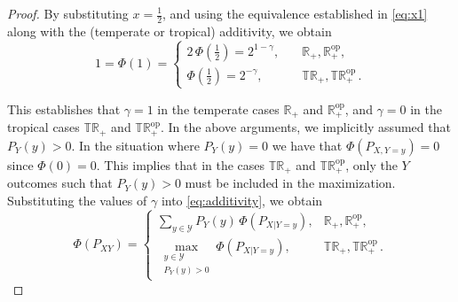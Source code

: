 \documentclass[aps,pra,11pt,onecolumn,nofootinbib,tightenlines]{revtex4-2}
\theoremstyle{definition}
\newcommand{\Y}{\mathcal{Y}}
\begin{document}
\begin{proof}
By substituting $x = \frac{1}{2}$, and using the equivalence established in \eqref{eq:x1} along with the (temperate or tropical) additivity, we obtain
\begin{equation}
1 = \Phi(1) =
\begin{cases}
2\,\Phi\!\left(\tfrac{1}{2}\right) = 2^{1-\gamma}, & \quad \mathbb{R}_+,\mathbb{R}_+^{\mathrm{op}}, \\
\Phi\!\left(\tfrac{1}{2}\right) = 2^{-\gamma}, & \quad \mathbb{TR}_+,\mathbb{TR}_+^{\mathrm{op}} \,.
\end{cases}
\end{equation}

This establishes that $\gamma = 1$ in the temperate cases $\mathbb{R}_+$ and $\mathbb{R}^{\mathrm{op}}_+$, and $\gamma = 0$ in the tropical cases $\mathbb{TR}_+$ and $\mathbb{TR}^{\mathrm{op}}_+$. In the above arguments, we implicitly assumed that $P_{Y}(y)>0$. In the situation where $P_Y(y)=0$ we have that $\Phi(P_{X,Y=y}) =0$ since $\Phi(0)=0$. This implies that in the cases $\mathbb{TR}_+$ and $\mathbb{TR}^{\mathrm{op}}_+$, only the $Y$ outcomes such that $P_Y(y)>0$ must be included in the maximization. Substituting the values of $\gamma$ into \eqref{eq:additivity}, we obtain
\begin{equation}\label{eq:general1}
\Phi(P_{XY}) =
\begin{cases}
\sum_{y \in \Y} P_Y(y)\,\Phi\!\left(P_{X|Y=y}\right), & \mathbb{R}_+,\mathbb{R}_+^{\mathrm{op}}, \\
\max \limits_{\substack{y \in \mathcal{Y} \\ P_Y( y) > 0}} \Phi\!\left(P_{X|Y=y}\right), & \mathbb{TR}_+,\mathbb{TR}_+^{\mathrm{op}} \,.
\end{cases}
\end{equation}

 \bigskip
 \bigskip
 

\end{proof}
\end{document}
